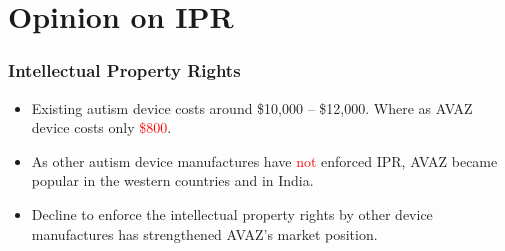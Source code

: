 \documentclass[12pt]{beamer}
\begin{document}
\section{Opinion on IPR}
{
\begin{frame}
	\frametitle {Intellectual Property Rights}
	\begin{itemize}
		\item Existing autism device costs around \$10,000 -- \$12,000. Where as AVAZ device costs only \textcolor{red}{\$800}. 
		\item As other autism device manufactures have \textcolor{red}{not} enforced IPR, AVAZ became popular in the western countries and in India. 
		\item Decline to enforce the intellectual property rights by other device manufactures has strengthened AVAZ's market position.
	\end{itemize}
\end{frame}
}
\end{document}
